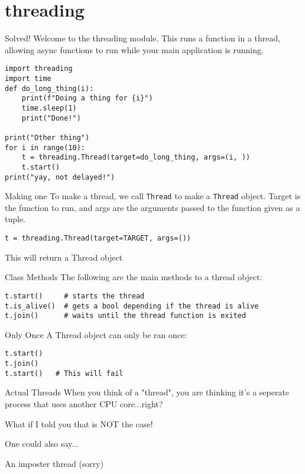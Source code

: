 \section{threading}

\begin{frame}[containsverbatim]{Solved!}
Welcome to the threading module. This runs a function in a thread, allowing async functions to run while your main application is running.
    \begin{verbatim}
import threading
import time
def do_long_thing(i):
    print(f"Doing a thing for {i}")
    time.sleep(1)
    print("Done!")

print("Other thing")
for i in range(10):
    t = threading.Thread(target=do_long_thing, args=(i, ))
    t.start()
print("yay, not delayed!")
  \end{verbatim}
\end{frame}

\begin{frame}[containsverbatim]{Making one}
To make a thread, we call \verb|Thread| to make a \verb|Thread| object. Target is the function to run, and args are the arguments passed to the function given as a tuple.
  \begin{verbatim}
t = threading.Thread(target=TARGET, args=())
\end{verbatim}
This will return a Thread object
\end{frame}


\begin{frame}[containsverbatim]{Class Methods}
The following are the main methods to a thread object:
    \begin{verbatim}
t.start()     # starts the thread
t.is_alive()  # gets a bool depending if the thread is alive
t.join()      # waits until the thread function is exited
\end{verbatim}
\end{frame}

\begin{frame}[containsverbatim]{Only Once}
A Thread object can only be ran once:
    \begin{verbatim}
t.start()
t.join()
t.start()   # This will fail
\end{verbatim}
\end{frame}

\begin{frame}{Actual Threads}
When you think of a "thread", you are thinking it's a seperate process that uses another CPU core...right?\pause

What if I told you that is NOT the case!\pause

One could also say...\pause

An imposter thread \pause
{}
(sorry)
\end{frame}

